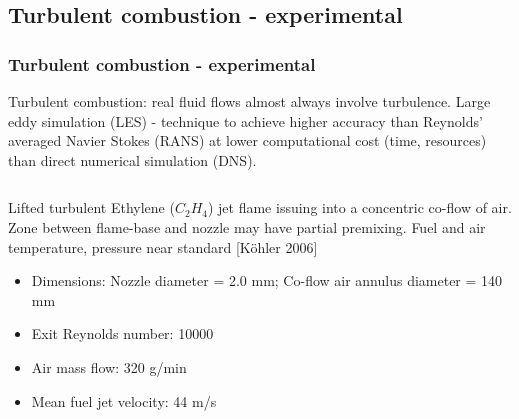 \documentclass{beamer}
\begin{document}
\subsection[experimental]{Turbulent combustion - experimental}
\begin{frame}%
\frametitle{Turbulent combustion - experimental}
\small{Turbulent combustion: real fluid flows almost always involve turbulence. Large eddy simulation (LES) - technique to achieve higher accuracy than Reynolds' averaged Navier Stokes (RANS) at lower computational cost (time, resources) than direct numerical simulation (DNS).}
\begin{minipage}[0.5\textheight]{\textwidth}
\begin{columns}[T]
\begin{column}{0.65\textwidth}
\vspace{20pt}
\small{Lifted turbulent Ethylene ($C_2H_4$) jet flame issuing into a concentric co-flow of air. Zone between flame-base and nozzle may have partial premixing. Fuel and air temperature, pressure near standard [K{\"o}hler 2006] \cite{Kohler}}
\begin{itemize}%
\tiny
\setlength\itemsep{-0.7mm}
\item Dimensions: Nozzle diameter = 2.0 mm; Co-flow air annulus diameter = 140 mm\\
\item Exit Reynolds number: 10000
\item Air mass flow: 320 g/min 
\item Mean fuel jet velocity: 44 m/s 
\end{itemize}
\end{column}


\end{columns}
\end{minipage}
\end{frame}
\end{document}
